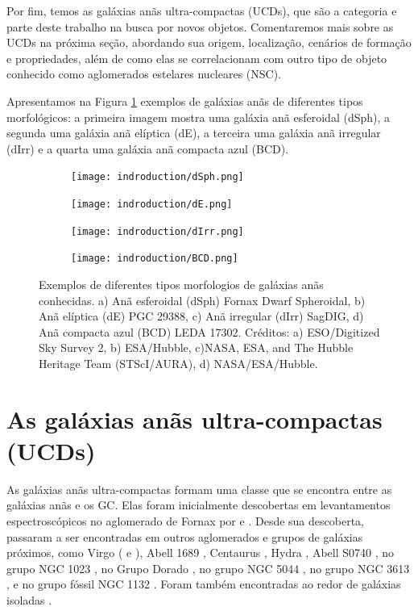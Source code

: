 Por fim, temos as galáxias anãs ultra-compactas (UCDs), que são a categoria e parte deste trabalho na busca por novos objetos. Comentaremos mais sobre as UCDs na próxima seção, abordando sua origem, localização, cenários de formação e propriedades, além de como elas se correlacionam com outro tipo de objeto conhecido como aglomerados estelares nucleares (\ac{NSC}).

Apresentamos na Figura \ref{dwarf_galaxies} exemplos de galáxias anãs de diferentes tipos morfológicos: a primeira imagem mostra uma galáxia anã esferoidal (dSph), a segunda uma galáxia anã elíptica (dE), a terceira uma galáxia anã irregular (dIrr) e a quarta uma galáxia anã compacta azul (BCD).


\begin{figure}[!ht]
    \centering
    \captionsetup{justification=centering}
    \begin{subfigure}[b]{0.33\textwidth}
        \texttt{[image: indroduction/dSph.png]}
        \caption{}
    \end{subfigure}
    \begin{subfigure}[b]{0.33\textwidth}
        \texttt{[image: indroduction/dE.png]}
        \caption{}
    \end{subfigure}
    \begin{subfigure}[b]{0.33\textwidth}
        \texttt{[image: indroduction/dIrr.png]}
        \caption{}
    \end{subfigure}
    \begin{subfigure}[b]{0.33\textwidth}
        \texttt{[image: indroduction/BCD.png]}
        \caption{}
    \end{subfigure}
    \caption{Exemplos de diferentes tipos morfologios de galáxias anãs conhecidas. a) Anã esferoidal (dSph) Fornax Dwarf Spheroidal, b) Anã elíptica (dE) PGC 29388, c) Anã irregular (dIrr) SagDIG, d) Anã compacta azul (BCD) LEDA 17302. Créditos: a) ESO/Digitized Sky Survey 2, b) ESA/Hubble, c)NASA, ESA, and The Hubble Heritage Team (STScI/AURA), d) NASA/ESA/Hubble.}
    \label{dwarf_galaxies}
\end{figure}

\section{As galáxias anãs ultra-compactas (UCDs)}\label{sec:UCDs}
As galáxias anãs ultra-compactas formam uma classe que se encontra entre as galáxias anãs e os \ac{GC}. Elas foram inicialmente descobertas em levantamentos espectroscópicos no aglomerado de Fornax por \cite{Drinkwater_2000} e \cite{Hilker_1999}. Desde sua descoberta, passaram a ser encontradas em outros aglomerados e grupos de galáxias próximos, como Virgo (\citealp{Hasegan_2005} e \citealp{Liu_2020}), Abell 1689 \citep{Mieske_2005}, Centaurus \citep{Mieske_2007}, Hydra \citep{Wehner_Harris_2007}, Abell S0740 \citep{Blakeslee_DeGraaff2008}, no grupo NGC 1023 \citep{Mieske_West_Oliveira_2007}, no Grupo Dorado \citep{Evstigneeva_2007}, no grupo NGC 5044 \citep{Faifer_2017}, no grupo NGC 3613 \citep{Bortoli_2020}, e no grupo fóssil NGC 1132 \citep{Madrid_2011}. Foram também encontradas ao redor de galáxias isoladas \citep{Hau_2009}.

